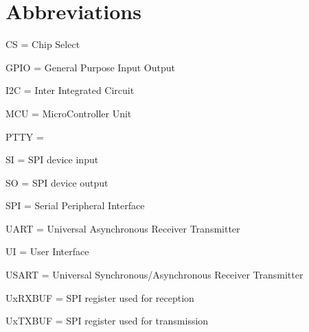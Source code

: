 \documentclass[a4paper,10pt]{report}
\begin{document}
\section{Abbreviations}
\begin{description}
  \item CS = Chip Select
  \item GPIO = General Purpose Input Output
  \item I2C = Inter Integrated Circuit
  \item MCU = MicroController Unit
  \item PTTY =
  \item SI = SPI device input
  \item SO = SPI device output
  \item SPI = Serial Peripheral Interface
  \item UART = Universal Asynchronous Receiver Transmitter
  \item UI = User Interface
  \item USART = Universal Synchronous/Asynchronous Receiver Transmitter
  \item UxRXBUF = SPI register used for reception
  \item UxTXBUF = SPI register used for transmission
\end{description}
\end{document}
